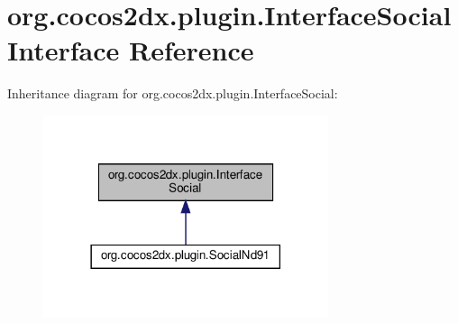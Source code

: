 \hypertarget{interfaceorg_1_1cocos2dx_1_1plugin_1_1InterfaceSocial}{}\section{org.\+cocos2dx.\+plugin.\+Interface\+Social Interface Reference}
\label{interfaceorg_1_1cocos2dx_1_1plugin_1_1InterfaceSocial}


Inheritance diagram for org.\+cocos2dx.\+plugin.\+Interface\+Social\+:
\nopagebreak
\begin{figure}[H]
\begin{center}
\leavevmode
\includegraphics[width=237pt]{interfaceorg_1_1cocos2dx_1_1plugin_1_1InterfaceSocial__inherit__graph}
\end{center}
\end{figure}
